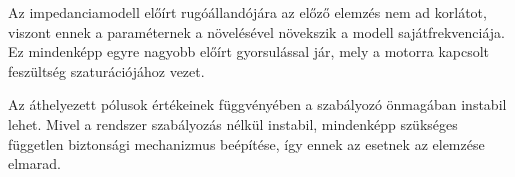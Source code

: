 Az impedanciamodell előírt rugóállandójára az előző elemzés nem ad korlátot, viszont 
ennek a paraméternek a növelésével növekszik a modell sajátfrekvenciája. Ez mindenképp 
egyre nagyobb előírt gyorsulással jár, mely a motorra kapcsolt feszültség szaturációjához vezet.

Az áthelyezett pólusok értékeinek függvényében a szabályozó önmagában instabil lehet. Mivel a rendszer szabályozás 
nélkül instabil, mindenképp szükséges független biztonsági mechanizmus beépítése, így ennek az esetnek az elemzése elmarad. 
